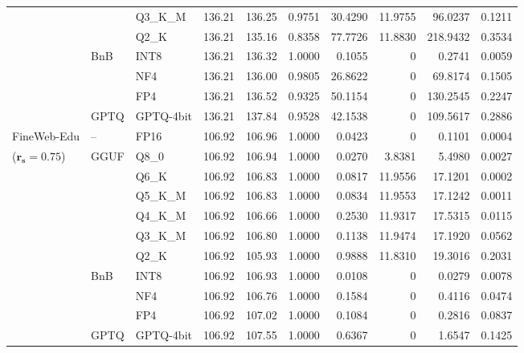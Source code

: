 \begin{longtable}{ll l rrrrrrr}
 &  & Q3\_K\_M & 136.21 & 136.25 & 0.9751 & 30.4290 & 11.9755 & 96.0237 & 0.1211 \\
 &  & Q2\_K & 136.21 & 135.16 & \cellcolor{red!18} 0.8358 & \cellcolor{red!18} 77.7726 & 11.8830 & \cellcolor{red!18} 218.9432 & \cellcolor{red!18} 0.3534 \\
 & BnB & INT8 & 136.21 & 136.32 & 1.0000 & 0.1055 & \cellcolor{cyan!12} $0$ & 0.2741 & 0.0059 \\
 &  & NF4 & 136.21 & 136.00 & 0.9805 & 26.8622 & \cellcolor{cyan!12} $0$ & 69.8174 & 0.1505 \\
 &  & FP4 & 136.21 & 136.52 & \cellcolor{red!18} 0.9325 & \cellcolor{red!18} 50.1154 & \cellcolor{cyan!12} $0$ & \cellcolor{red!18} 130.2545 & \cellcolor{red!18} 0.2247 \\
 & GPTQ & GPTQ-4bit & 136.21 & 137.84 & 0.9528 & 42.1538 & \cellcolor{cyan!12} $0$ & 109.5617 & 0.2886 \\
\midrule
FineWeb-Edu & -- & FP16 & 106.92 & 106.96 & 1.0000 & 0.0423 & \cellcolor{cyan!12} $0$ & 0.1101 & 0.0004 \\
{\small ($\mathbf{r_s{=}0.75}$)} & GGUF & Q8\_0 & 106.92 & 106.94 & 1.0000 & 0.0270 & 3.8381 & 5.4980 & 0.0027 \\
 &  & Q6\_K & 106.92 & 106.83 & 1.0000 & 0.0817 & 11.9556 & 17.1201 & 0.0002 \\
 &  & Q5\_K\_M & 106.92 & 106.83 & 1.0000 & 0.0834 & 11.9553 & 17.1242 & 0.0011 \\
 &  & Q4\_K\_M & 106.92 & 106.66 & 1.0000 & 0.2530 & 11.9317 & 17.5315 & 0.0115 \\
 &  & Q3\_K\_M & 106.92 & 106.80 & 1.0000 & 0.1138 & 11.9474 & 17.1920 & 0.0562 \\
 &  & Q2\_K & 106.92 & 105.93 & 1.0000 & 0.9888 & 11.8310 & 19.3016 & 0.2031 \\
 & BnB & INT8 & 106.92 & 106.93 & 1.0000 & 0.0108 & \cellcolor{cyan!12} $0$ & 0.0279 & 0.0078 \\
 &  & NF4 & 106.92 & 106.76 & 1.0000 & 0.1584 & \cellcolor{cyan!12} $0$ & 0.4116 & 0.0474 \\
 &  & FP4 & 106.92 & 107.02 & 1.0000 & 0.1084 & \cellcolor{cyan!12} $0$ & 0.2816 & 0.0837 \\
 & GPTQ & GPTQ-4bit & 106.92 & 107.55 & 1.0000 & 0.6367 & \cellcolor{cyan!12} $0$ & 1.6547 & 0.1425 \\
\end{longtable}
\endgroup